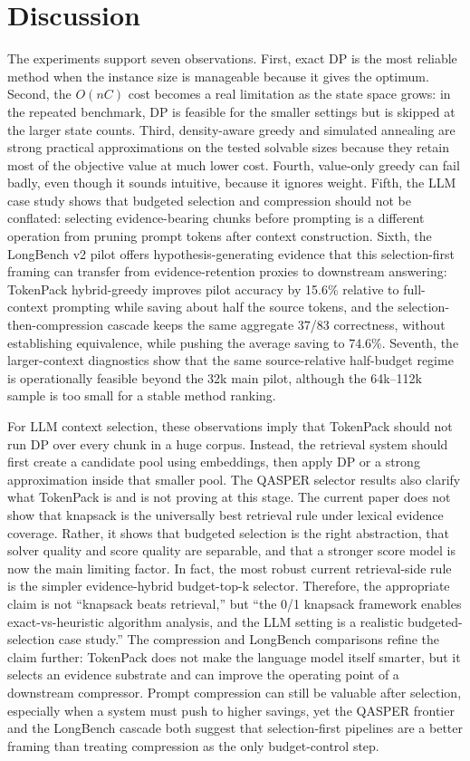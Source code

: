 \documentclass[conference]{IEEEtran}
\begin{document}
\section{Discussion}
The experiments support seven observations. First, exact DP is the most reliable method when the instance size is manageable because it gives the optimum. Second, the $O(nC)$ cost becomes a real limitation as the state space grows: in the repeated benchmark, DP is feasible for the smaller settings but is skipped at the larger state counts. Third, density-aware greedy and simulated annealing are strong practical approximations on the tested solvable sizes because they retain most of the objective value at much lower cost. Fourth, value-only greedy can fail badly, even though it sounds intuitive, because it ignores weight. Fifth, the LLM case study shows that budgeted selection and compression should not be conflated: selecting evidence-bearing chunks before prompting is a different operation from pruning prompt tokens after context construction. Sixth, the LongBench v2 pilot offers hypothesis-generating evidence that this selection-first framing can transfer from evidence-retention proxies to downstream answering: TokenPack hybrid-greedy improves pilot accuracy by 15.6\% relative to full-context prompting while saving about half the source tokens, and the selection-then-compression cascade keeps the same aggregate 37/83 correctness, without establishing equivalence, while pushing the average saving to 74.6\%. Seventh, the larger-context diagnostics show that the same source-relative half-budget regime is operationally feasible beyond the 32k main pilot, although the 64k--112k sample is too small for a stable method ranking.

For LLM context selection, these observations imply that TokenPack should not run DP over every chunk in a huge corpus. Instead, the retrieval system should first create a candidate pool using embeddings, then apply DP or a strong approximation inside that smaller pool. The QASPER selector results also clarify what TokenPack is and is not proving at this stage. The current paper does not show that knapsack is the universally best retrieval rule under lexical evidence coverage. Rather, it shows that budgeted selection is the right abstraction, that solver quality and score quality are separable, and that a stronger score model is now the main limiting factor. In fact, the most robust current retrieval-side rule is the simpler evidence-hybrid budget-top-k selector. Therefore, the appropriate claim is not ``knapsack beats retrieval,'' but ``the 0/1 knapsack framework enables exact-vs-heuristic algorithm analysis, and the LLM setting is a realistic budgeted-selection case study.'' The compression and LongBench comparisons refine the claim further: TokenPack does not make the language model itself smarter, but it selects an evidence substrate and can improve the operating point of a downstream compressor. Prompt compression can still be valuable after selection, especially when a system must push to higher savings, yet the QASPER frontier and the LongBench cascade both suggest that selection-first pipelines are a better framing than treating compression as the only budget-control step.
\end{document}
